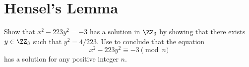 \documentclass[../notes.tex]{subfiles}
\begin{document}
\section{Hensel's Lemma}

\begin{prob} \label{prob:223-in-z3}
	Show that $x^2-223y^2=-3$ has a solution in $\ZZ_3$ by showing that there exists $y\in\ZZ_3$ such that $y^2=4/223$. Use  to conclude that the equation
	\[x^2-223y^2\equiv-3\pmod n\]
	has a solution for any positive integer $n$.
\end{prob}
\end{document}
